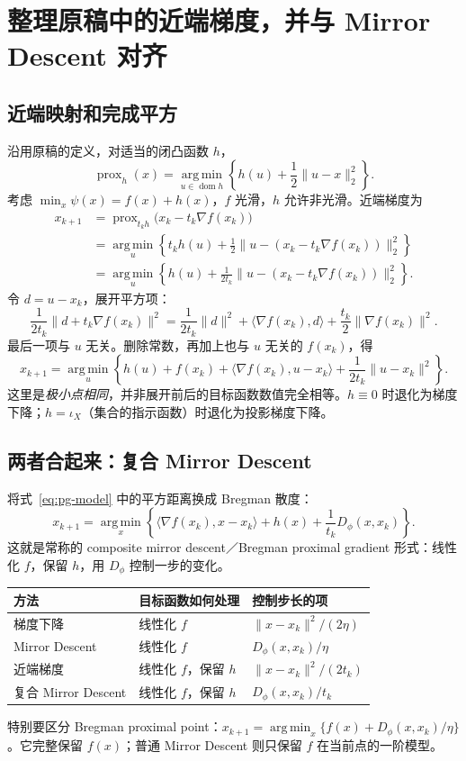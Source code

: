 \documentclass[11pt,a4paper]{ctexart}
\newcommand{\argmin}{\operatorname*{arg\,min}}
\newcommand{\prox}{\operatorname{prox}}
\newcommand{\dom}{\operatorname{dom}}
\begin{document}
\section{整理原稿中的近端梯度，并与 Mirror Descent 对齐}
\subsection{近端映射和完成平方}
沿用原稿的定义，对适当的闭凸函数 $h$，
\[
\prox_h(x)=\argmin_{u\in\dom h}\left\{h(u)+\frac12\|u-x\|_2^2\right\}.
\]
考虑 $\min_x\psi(x)=f(x)+h(x)$，$f$ 光滑，$h$ 允许非光滑。近端梯度为
\begin{align}
x_{k+1}
&=\prox_{t_kh}\bigl(x_k-t_k\nabla f(x_k)\bigr)\nonumber\\
&=\argmin_u\left\{t_kh(u)+\frac12\|u-(x_k-t_k\nabla f(x_k))\|_2^2\right\}\nonumber\\
&=\argmin_u\left\{h(u)+\frac1{2t_k}\|u-(x_k-t_k\nabla f(x_k))\|_2^2\right\}.
\end{align}
令 $d=u-x_k$，展开平方项：
\[
\frac1{2t_k}\|d+t_k\nabla f(x_k)\|^2
=\frac1{2t_k}\|d\|^2+\langle\nabla f(x_k),d\rangle
+\frac{t_k}{2}\|\nabla f(x_k)\|^2.
\]
最后一项与 $u$ 无关。删除常数，再加上也与 $u$ 无关的 $f(x_k)$，得
\begin{equation}\label{eq:pg-model}
x_{k+1}=\argmin_u\left\{h(u)+f(x_k)+\langle\nabla f(x_k),u-x_k\rangle
+\frac1{2t_k}\|u-x_k\|^2\right\}.
\end{equation}
这里是\emph{极小点相同}，并非展开前后的目标函数数值完全相等。$h\equiv0$ 时退化为梯度下降；$h=\iota_X$（集合的指示函数）时退化为投影梯度下降。

\subsection{两者合起来：复合 Mirror Descent}
将式~\eqref{eq:pg-model} 中的平方距离换成 Bregman 散度：
\begin{equation}\label{eq:composite-md}
\boxed{x_{k+1}=\argmin_x\left\{
\langle\nabla f(x_k),x-x_k\rangle+h(x)+\frac1{t_k}D_\phi(x,x_k)
\right\}.}
\end{equation}
这就是常称的 composite mirror descent／Bregman proximal gradient 形式：线性化 $f$，保留 $h$，用 $D_\phi$ 控制一步的变化。
\begin{center}
\begin{tabularx}{\textwidth}{@{}lXX@{}}
\toprule
方法 & 目标函数如何处理 & 控制步长的项\\
\midrule
梯度下降 & 线性化 $f$ & $\|x-x_k\|^2/(2\eta)$\\
Mirror Descent & 线性化 $f$ & $D_\phi(x,x_k)/\eta$\\
近端梯度 & 线性化 $f$，保留 $h$ & $\|x-x_k\|^2/(2t_k)$\\
复合 Mirror Descent & 线性化 $f$，保留 $h$ & $D_\phi(x,x_k)/t_k$\\
\bottomrule
\end{tabularx}
\end{center}
特别要区分 Bregman proximal point：$x_{k+1}=\argmin_x\{f(x)+D_\phi(x,x_k)/\eta\}$。它完整保留 $f(x)$；普通 Mirror Descent 则只保留 $f$ 在当前点的一阶模型。
\end{document}
